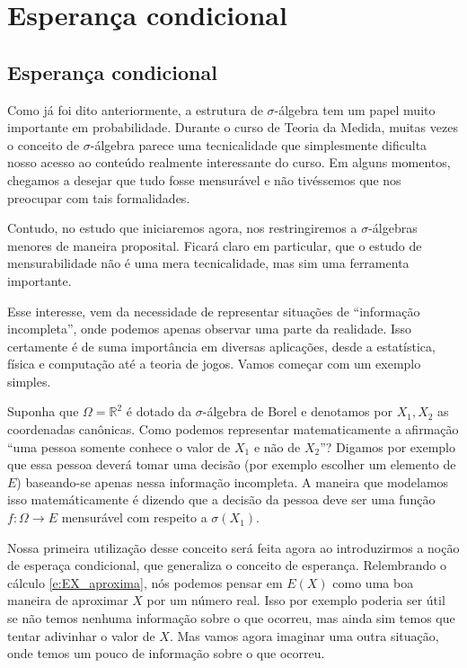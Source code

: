 \documentclass[../Notas_de_aula.tex]{subfiles}
\begin{document}
\chapter{Esperança condicional}

\section{Esperança condicional}

Como já foi dito anteriormente, a estrutura de $\sigma$-álgebra tem um papel muito importante em probabilidade.
Durante o curso de Teoria da Medida, muitas vezes o conceito de $\sigma$-álgebra parece uma tecnicalidade que simplesmente dificulta nosso acesso ao conteúdo realmente interessante do curso.
Em alguns momentos, chegamos a desejar que tudo fosse mensurável e não tivéssemos que nos preocupar com tais formalidades.

Contudo, no estudo que iniciaremos agora, nos restringiremos a $\sigma$-álgebras menores de maneira proposital.
Ficará claro em particular, que o estudo de mensurabilidade não é uma mera tecnicalidade, mas sim uma ferramenta importante.

Esse interesse, vem da necessidade de representar situações de ``informação incompleta'', onde podemos apenas observar uma parte da realidade.
Isso certamente é de suma importância em diversas aplicações, desde a estatística, física e computação até a teoria de jogos.
Vamos começar com um exemplo simples.

Suponha que $\Omega = \mathbb{R}^2$ é dotado da $\sigma$-álgebra de Borel e denotamos por $X_1, X_2$ as coordenadas canônicas.
Como podemos representar matematicamente a afirmação ``uma pessoa somente conhece o valor de $X_1$ e não de $X_2$''?
Digamos por exemplo que essa pessoa deverá tomar uma decisão (por exemplo escolher um elemento de $E$) baseando-se apenas nessa informação incompleta.
A maneira que modelamos isso matemáticamente é dizendo que a decisão da pessoa deve ser uma função $f: \Omega \to E$ mensurável com respeito a $\sigma(X_1)$.

Nossa primeira utilização desse conceito será feita agora ao introduzirmos a noção de esperaça condicional, que generaliza o conceito de esperança.
Relembrando o cálculo \eqref{e:EX_aproxima}, nós podemos pensar em $E(X)$ como uma boa maneira de aproximar $X$ por um número real.
Isso por exemplo poderia ser útil se não temos nenhuma informação sobre o que ocorreu, mas ainda sim temos que tentar adivinhar o valor de $X$.
Mas vamos agora imaginar uma outra situação, onde temos um pouco de informação sobre o que ocorreu.
\end{document}
